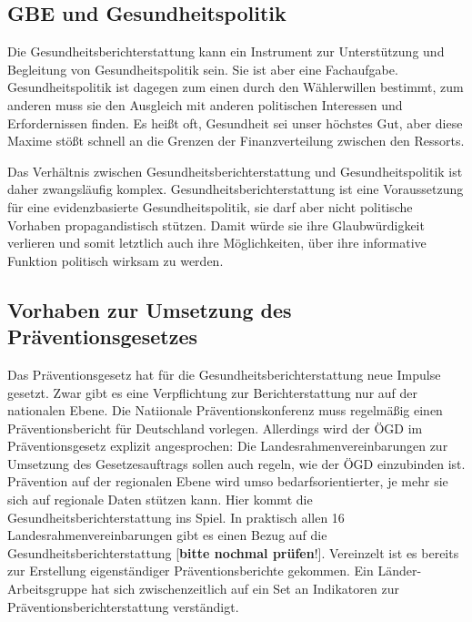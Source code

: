 \documentclass{article}
\begin{document}
\subsection{GBE und Gesundheitspolitik}\label{H7792675}



Die Gesundheitsberichterstattung kann ein Instrument zur Unterstützung und Begleitung von Gesundheitspolitik sein. Sie ist aber eine Fachaufgabe. Gesundheitspolitik ist dagegen zum einen durch den Wählerwillen bestimmt, zum anderen muss sie den Ausgleich mit anderen politischen Interessen und Erfordernissen finden. Es heißt oft, Gesundheit sei unser höchstes Gut, aber diese Maxime stößt schnell an die Grenzen der Finanzverteilung zwischen den Ressorts. 


Das Verhältnis zwischen Gesundheitsberichterstattung und Gesundheitspolitik ist daher zwangsläufig komplex. Gesundheitsberichterstattung ist eine Voraussetzung für eine evidenzbasierte Gesundheitspolitik, sie darf aber nicht politische Vorhaben propagandistisch stützen. Damit würde sie ihre Glaubwürdigkeit verlieren und somit letztlich auch ihre Möglichkeiten, über ihre informative Funktion politisch wirksam zu werden.


\subsection{Vorhaben zur Umsetzung des Präventionsgesetzes}\label{H1192227}



Das Präventionsgesetz hat für die Gesundheitsberichterstattung neue Impulse gesetzt. Zwar gibt es eine Verpflichtung zur Berichterstattung nur auf der nationalen Ebene. Die Natiionale Präventionskonferenz muss regelmäßig einen Präventionsbericht für Deutschland vorlegen. Allerdings wird der ÖGD im Präventionsgesetz explizit angesprochen: Die Landesrahmenvereinbarungen zur Umsetzung des Gesetzesauftrags sollen auch regeln, wie der ÖGD einzubinden ist. Prävention auf der regionalen Ebene wird umso bedarfsorientierter, je mehr sie sich auf regionale Daten stützen kann. Hier kommt die Gesundheitsberichterstattung ins Spiel. In praktisch allen 16 Landesrahmenvereinbarungen gibt es einen Bezug auf die Gesundheitsberichterstattung [\textbf{bitte nochmal prüfen}!]. Vereinzelt ist es bereits zur Erstellung eigenständiger Präventionsberichte gekommen. Ein Länder-Arbeitsgruppe hat sich zwischenzeitlich auf ein Set an Indikatoren zur Präventionsberichterstattung verständigt.





\printbibliography[title={Literaturverzeichnis}]
\end{document}
